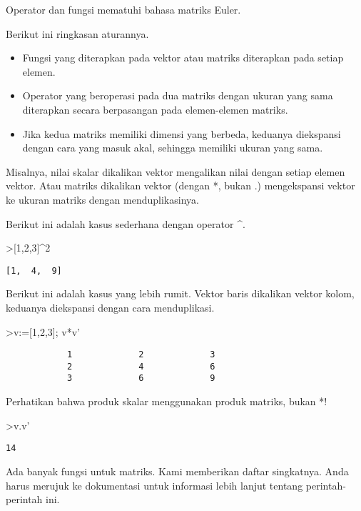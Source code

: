 \documentclass[
]{book}
\begin{document}
Operator dan fungsi mematuhi bahasa matriks Euler.

Berikut ini ringkasan aturannya.

\begin{itemize}
\item
  Fungsi yang diterapkan pada vektor atau matriks diterapkan pada setiap elemen.
\item
  Operator yang beroperasi pada dua matriks dengan ukuran yang sama diterapkan secara berpasangan pada elemen-elemen matriks.
\item
  Jika kedua matriks memiliki dimensi yang berbeda, keduanya diekspansi dengan cara yang masuk akal, sehingga memiliki ukuran yang sama.
\end{itemize}

Misalnya, nilai skalar dikalikan vektor mengalikan nilai dengan setiap elemen vektor. Atau matriks dikalikan vektor (dengan *, bukan .) mengekspansi vektor ke ukuran matriks dengan menduplikasinya.

Berikut ini adalah kasus sederhana dengan operator \^{}.

\textgreater{[}1,2,3{]}\^{}2

\begin{verbatim}
[1,  4,  9]
\end{verbatim}

Berikut ini adalah kasus yang lebih rumit. Vektor baris dikalikan vektor kolom, keduanya diekspansi dengan cara menduplikasi.

\textgreater v:={[}1,2,3{]}; v*v'

\begin{verbatim}
            1             2             3 
            2             4             6 
            3             6             9 
\end{verbatim}

Perhatikan bahwa produk skalar menggunakan produk matriks, bukan *!

\textgreater v.v'

\begin{verbatim}
14
\end{verbatim}

Ada banyak fungsi untuk matriks. Kami memberikan daftar singkatnya. Anda harus merujuk ke dokumentasi untuk informasi lebih lanjut tentang perintah-perintah ini.
\end{document}
